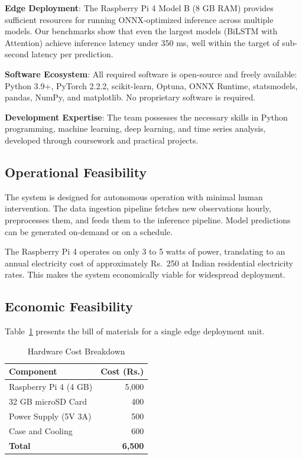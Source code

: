 \textbf{Edge Deployment}: The Raspberry Pi 4 Model B (8 GB RAM) provides sufficient resources for running ONNX-optimized inference across multiple models. Our benchmarks show that even the largest models (BiLSTM with Attention) achieve inference latency under 350 ms, well within the target of sub-second latency per prediction.

\textbf{Software Ecosystem}: All required software is open-source and freely available: Python 3.9+, PyTorch 2.2.2, scikit-learn, Optuna, ONNX Runtime, statsmodels, pandas, NumPy, and matplotlib. No proprietary software is required.

\textbf{Development Expertise}: The team possesses the necessary skills in Python programming, machine learning, deep learning, and time series analysis, developed through coursework and practical projects.

\subsection{Operational Feasibility}

The system is designed for autonomous operation with minimal human intervention. The data ingestion pipeline fetches new observations hourly, preprocesses them, and feeds them to the inference pipeline. Model predictions can be generated on-demand or on a schedule.

The Raspberry Pi 4 operates on only 3 to 5 watts of power, translating to an annual electricity cost of approximately Rs.~250 at Indian residential electricity rates. This makes the system economically viable for widespread deployment.

\subsection{Economic Feasibility}

Table~\ref{tab:hw_cost} presents the bill of materials for a single edge deployment unit.

\begin{table}[H]
\centering
\caption{Hardware Cost Breakdown}
\label{tab:hw_cost}
\begin{tabular}{lr}
\toprule
\textbf{Component} & \textbf{Cost (Rs.)} \\
\midrule
Raspberry Pi 4 (4 GB) & 5,000 \\
32 GB microSD Card & 400 \\
Power Supply (5V 3A) & 500 \\
Case and Cooling & 600 \\
\midrule
\textbf{Total} & \textbf{6,500} \\
\bottomrule
\end{tabular}
\end{table}

